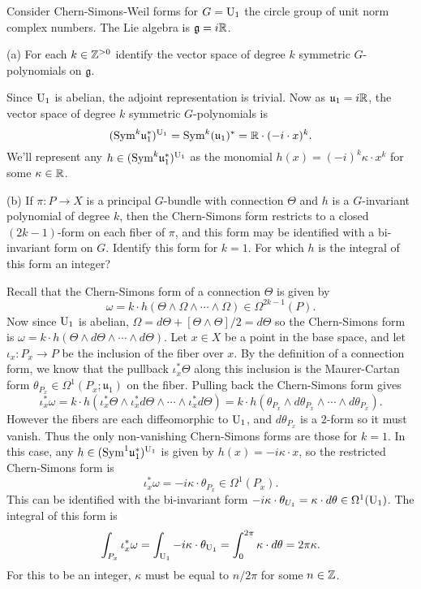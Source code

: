 \documentclass{../../templates/lkx_pset}
\begin{document}
\begin{problem}{2}
Consider Chern-Simons-Weil forms for $G=\operatorname{U}_1$ the circle group of unit norm complex numbers. The Lie algebra is $\mathfrak{g}=i\mathbb{R}$.
\end{problem}
\begin{parts}
	\begin{part}{(a)}
		For each $k\in \mathbb{Z}^{>0}$ identify the vector space of degree $k$ symmetric $G$-polynomials on $\mathfrak{g}$.
	\end{part}

	Since $\operatorname{U}_1$ is abelian, the adjoint representation is trivial.
	Now as $\mathfrak{u}_1=i\mathbb{R}$, the vector space of degree $k$ symmetric $G$-polynomials is
	\[
		(\textrm{Sym}^k \mathfrak{u}_1^*)^{\operatorname{U}_1} = \textrm{Sym}^k (\mathfrak{u}_1)^* = \mathbb{R}\cdot (-i\cdot x)^k.
	\]
	We'll represent any $h\in (\textrm{Sym}^k\mathfrak{u}_1^*)^{\operatorname{U}_1}$ as the monomial $h(x)=(-i)^k \kappa \cdot x^k$ for some $\kappa\in \mathbb{R}$.

	\begin{part}{(b)}
		If $\pi : P \to X$ is a principal $G$-bundle with connection $\Theta$ and $h$ is a $G$-invariant polynomial of degree $k$, then the Chern-Simons form restricts to a closed $(2k-1)$-form on each fiber of $\pi$, and this form may be identified with a bi-invariant form on $G$. Identify this form for $k=1$. For which $h$ is the integral of this form an integer?
	\end{part}

	Recall that the Chern-Simons form of a connection $\Theta$ is given by
	\[
		\omega = k\cdot h(\Theta\wedge \Omega\wedge\cdots \wedge\Omega)\in\Omega^{2k-1}(P).
	\]
	Now since $\operatorname{U}_1$ is abelian, $\Omega = d\Theta + [\Theta\wedge\Theta]/2 = d\Theta$ so the Chern-Simons form is $\omega = k\cdot h(\Theta\wedge d\Theta\wedge\cdots\wedge d\Theta)$. Let $x\in X$ be a point in the base space, and let $\iota_x : P_x \to P$ be the inclusion of the fiber over $x$. By the definition of a connection form, we know that the pullback $\iota_x^* \Theta$ along this inclusion is the Maurer-Cartan form $\theta_{P_x}\in \Omega^1(P_x; \mathfrak{u}_1)$ on the fiber. Pulling back the Chern-Simons form gives
	\[
		\iota_x^* \omega = k\cdot h(\iota_x^* \Theta\wedge \iota_x^* d\Theta\wedge \cdots \wedge \iota_x^* d\Theta) = k\cdot h(\theta_{P_x}\wedge d\theta_{P_x}\wedge\cdots\wedge d\theta_{P_x}).
	\]
	However the fibers are each diffeomorphic to $\operatorname{U}_1$, and $d\theta_{P_x}$ is a $2$-form so it must vanish. Thus the only non-vanishing Chern-Simons forms are those for $k=1$. In this case, any $h\in (\textrm{Sym}^1 \mathfrak{u}_1^*)^{\operatorname{U}_1}$ is given by $h(x) = -i\kappa \cdot x$, so the restricted Chern-Simons form is
	\[
		\iota^*_x \omega = -i\kappa\cdot \theta_{P_x} \in \Omega^1(P_x).
	\]
	This can be identified with the bi-invariant form $-i\kappa\cdot \theta_{U_1} = \kappa\cdot d\theta\in \Omega^1(\operatorname{U}_1)$. The integral of this form is
	\[
		\int_{P_x} \iota_x^*\omega = \int_{\operatorname{U}_1} -i\kappa\cdot \theta_{\operatorname{U}_1} = \int_0^{2\pi} \kappa \cdot d\theta = 2\pi \kappa.
	\]
	For this to be an integer, $\kappa$ must be equal to $n/2\pi$ for some $n\in \mathbb{Z}$.


\end{parts}
\end{document}
